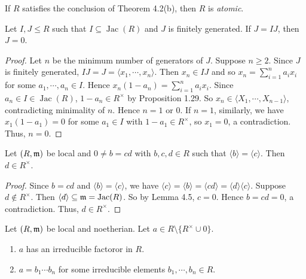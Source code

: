 \begin{definition}
    If $R$ satisfies the conclusion of Theorem 4.2(b), then $R$ is \emph {atomic}.
\end{definition}

\begin{lemma}
    Let $I,J \leq R$ such that $I \subseteq \operatorname{Jac}(R)$ and $J$ is finitely generated. If $J = IJ$, then $J = 0$.
\end{lemma}

\begin{proof}
    Let $n$ be the minimum number of generators of $J$. Suppose $n \geq 2$. Since $J$ is finitely generated, $IJ = J = \langle x_1,\cdots,x_n \rangle$. Then $x_n \in IJ$ and so $x_n = \sum_{i=1}^{n}a_ix_i$ for some $a_1,\cdots,a_n \in I$. Hence $x_n(1-a_n) = \sum_{i=1}^{n}a_ix_i$. Since $a_n \in I \in \operatorname{Jac}(R)$, $1-a_n \in R^{\times}$ by Proposition 1.29. So $x_n \in \langle X_1,\cdots,X_{n-1} \rangle$, contradicting minimality of $n$. Hence $n = 1$ or $0$. If $n = 1$, similarly, we have $x_1(1-a_1) = 0$ for some $a_1 \in I$ with $1-a_1 \in R^{\times}$, so $x_1 = 0$, a contradiction. Thus, $n = 0$.
\end{proof}

\begin{lemma}
    Let $(R,\mathfrak{m})$ be local and $0 \neq b = cd$ with $b,c,d \in R$ such that $\langle b \rangle = \langle c \rangle$. Then $d \in R^{\times}$.
\end{lemma}

\begin{proof}
    Since $b = cd$ and $\langle b \rangle = \langle c \rangle$, we have $\langle c \rangle = \langle b \rangle = \langle cd \rangle = \langle d \rangle \langle c \rangle$. Suppose $d \not \in R^{\times}$. Then $\langle d \rangle \subseteq \mathfrak{m} = \operatorname{Jac}(R)$. So by Lemma 4.5, $c = 0$. Hence $b = cd = 0$, a contradiction. Thus, $d \in R^{\times}$.
\end{proof}

\begin{theorem}
    Let $(R,\mathfrak{m})$ be local and noetherian. Let $a \in R \setminus \{R^{\times} \cup 0\}$. 
    \begin{enumerate}
        \item $a$ has an irreducible factoror in $R$.
        \item $a = b_1 \cdots b_n$ for some irreducible elements $b_1,\cdots,b_n \in R$.
    \end{enumerate}
\end{theorem}

